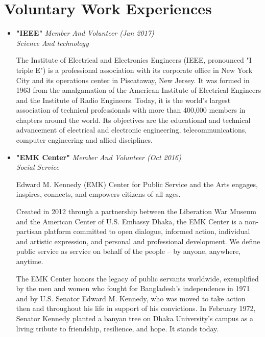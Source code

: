 \documentclass[11pt,a4paper,sans]{moderncv}        %
\begin{document}
\section{Voluntary Work Experiences}

\vspace{6pt}

\begin{itemize}

\item{\textbf{"IEEE"} \textit{Member And Volunteer (Jan 2017) \\ Science And technology}

\vspace{3pt}

\small{The Institute of Electrical and Electronics Engineers (IEEE, pronounced "I triple E") is a professional association with its corporate office in New York City and its operations center in Piscataway, New Jersey.
It was formed in 1963 from the amalgamation of the American Institute of Electrical Engineers and the Institute of Radio Engineers.
Today, it is the world's largest association of technical professionals with more than 400,000 members in chapters around the world.
Its objectives are the educational and technical advancement of electrical and electronic engineering, telecommunications, computer engineering and allied disciplines.}}

\vspace{6pt}

\item{\textbf{"EMK Center"} \textit{Member And Volunteer (Oct 2016) \\ Social Service}

\vspace{3pt}

\small{Edward M. Kennedy (EMK) Center for Public Service and the Arts engages, inspires, connects, and empowers citizens of all ages.

Created in 2012 through a partnership between the Liberation War Museum and the American Center of U.S. Embassy Dhaka, the EMK Center is a non-partisan platform committed to open dialogue, informed action, individual and artistic expression, and personal and professional development. We define public service as service on behalf of the people – by anyone, anywhere, anytime.

The EMK Center honors the legacy of public servants worldwide, exemplified by the men and women who fought for Bangladesh’s independence in 1971 and by U.S. Senator Edward M. Kennedy, who was moved to take action then and throughout his life in support of his convictions. In February 1972, Senator Kennedy planted a banyan tree on Dhaka University’s campus as a living tribute to friendship, resilience, and hope. It stands today.}}


\end{itemize}
\end{document}
